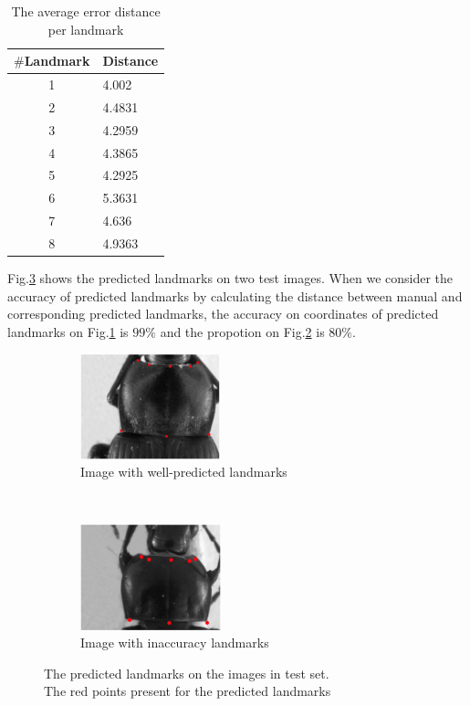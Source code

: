 \documentclass[10pt]{article}
\begin{document}
\begin{table}[htbp]
\centering
\begin{tabular}{|c|p{1.5cm}|}
\hline
\textbf{$\#$Landmark} & \textbf{Distance} \\ \hline
1 & 4.002  \\ \hline
2 & 4.4831 \\ \hline
3 & 4.2959 \\ \hline
4 & 4.3865 \\ \hline
5 & 4.2925 \\ \hline
6 & 5.3631 \\ \hline
7 & 4.636 \\ \hline
8 & 4.9363 \\ \hline
\end{tabular}
\caption{The average error distance per landmark}
\label{tabledistance}
\end{table}
Fig.\ref{figrsexample} shows the predicted landmarks on two test images. When we consider the accuracy of predicted landmarks by calculating the distance between manual and corresponding predicted landmarks, the accuracy on coordinates of predicted landmarks on Fig.\ref{figsub1} is $99\%$ and the propotion on Fig.\ref{figsub2} is $80\%$.

\begin{figure}[htbp]
    \centering
    \begin{subfigure}[t]{0.25\textwidth}
        \centering
        \includegraphics[height=1.2in]{images/plandmark}
        \caption{Image with well-predicted landmarks}
        \label{figsub1}
    \end{subfigure}%
    ~ 
    \begin{subfigure}[t]{0.25\textwidth}
        \centering
        \includegraphics[height=1.2in]{images/plandmark2}
        \caption{Image with inaccuracy landmarks}
        \label{figsub2}
    \end{subfigure}
    \caption{The predicted landmarks on the images in test set.\\
    		 The red points present for the predicted landmarks}
    \label{figrsexample}
\end{figure}
\end{document}
